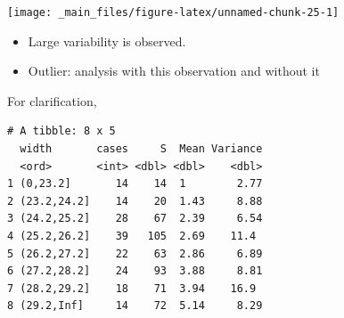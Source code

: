 \documentclass[]{book}
\newenvironment{Shaded}{\begin{snugshade}}{\end{snugshade}}
\newcommand{\DataTypeTok}[1]{\textcolor[rgb]{0.13,0.29,0.53}{#1}}
\newcommand{\DecValTok}[1]{\textcolor[rgb]{0.00,0.00,0.81}{#1}}
\newcommand{\FloatTok}[1]{\textcolor[rgb]{0.00,0.00,0.81}{#1}}
\newcommand{\KeywordTok}[1]{\textcolor[rgb]{0.13,0.29,0.53}{\textbf{#1}}}
\newcommand{\NormalTok}[1]{#1}
\newcommand{\OperatorTok}[1]{\textcolor[rgb]{0.81,0.36,0.00}{\textbf{#1}}}
\newcommand{\OtherTok}[1]{\textcolor[rgb]{0.56,0.35,0.01}{#1}}
\newcommand{\StringTok}[1]{\textcolor[rgb]{0.31,0.60,0.02}{#1}}
\providecommand{\tightlist}{%
  \setlength{\itemsep}{0pt}\setlength{\parskip}{0pt}}
\begin{document}
\begin{Shaded}
\end{Shaded}

\begin{center}\texttt{[image: \_main\_files/figure-latex/unnamed-chunk-25-1]} \end{center}

\begin{itemize}
\tightlist
\item
  Large variability is observed.
\item
  Outlier: analysis with this observation and without it
\end{itemize}

For clarification,

\begin{Shaded}
\end{Shaded}

\begin{verbatim}
# A tibble: 8 x 5
  width       cases     S  Mean Variance
  <ord>       <int> <dbl> <dbl>    <dbl>
1 (0,23.2]       14    14  1        2.77
2 (23.2,24.2]    14    20  1.43     8.88
3 (24.2,25.2]    28    67  2.39     6.54
4 (25.2,26.2]    39   105  2.69    11.4 
5 (26.2,27.2]    22    63  2.86     6.89
6 (27.2,28.2]    24    93  3.88     8.81
7 (28.2,29.2]    18    71  3.94    16.9 
8 (29.2,Inf]     14    72  5.14     8.29
\end{verbatim}
\end{document}
